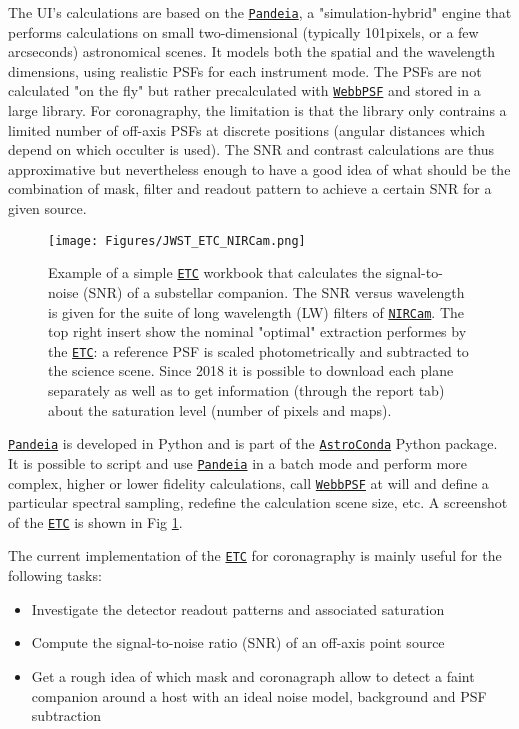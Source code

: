 \documentclass[]{spie}  %
\newcommand{\todo}[1]{\textcolor{red}{[#1]}}
\newcommand{\nircam}{{\tt \href{https://jwst.stsci.edu/instrumentation/nircam}{NIRCam}}\xspace}
\newcommand{\etc}{{\tt \href{https://jwst.etc.stsci.edu/}{ETC}}\xspace}
\newcommand{\pandeia}{{\tt \href{https://pypi.org/project/pandeia.engine/}{Pandeia}}\xspace}
\newcommand{\astroconda}{{\tt \href{https://astroconda.readthedocs.io/en/latest/}{AstroConda}}\xspace}
\newcommand{\webbpsf}{{\tt \href{https://webbpsf.readthedocs.io/en/stable/}{WebbPSF}}\xspace}%
\def\begini{\begin{itemize}[itemsep=0.5pt,topsep=0.5pt]}
\def\endi{\end{itemize}}
\begin{document}
The UI's calculations are based on the \pandeia\cite{pontoppidan2016_spie_pandeia}, a "simulation-hybrid" engine that performs calculations on small two-dimensional (typically 101pixels, or a few arcseconds) astronomical scenes. It models both the spatial and the wavelength dimensions, using realistic PSFs for each instrument mode. The PSFs are not calculated "on the fly" but rather precalculated with \webbpsf and stored in a large library. For coronagraphy, the limitation is that the library only contrains a limited number of off-axis PSFs at discrete positions (angular distances which depend on which occulter is used). The SNR and contrast calculations are thus approximative but nevertheless enough to have a good idea of what should be the combination of mask, filter and readout pattern to achieve a certain SNR for a given source.

\begin{figure}[h!]
\begin{center}
\texttt{[image: Figures/JWST\_ETC\_NIRCam.png]}
\caption{Example of a simple \etc workbook that calculates the signal-to-noise (SNR) of a substellar companion. The SNR versus wavelength is given for the suite of long wavelength (LW) filters of \nircam. The top right insert show the nominal "optimal" extraction performes by the \etc: a reference PSF is scaled photometrically and subtracted to the science scene. Since 2018 it is possible to download each plane separately as well as to get information (through the report tab) about the saturation level (number of pixels and maps).}
\label{fig:jwst-etc}
\end{center}
\end{figure}

\pandeia is developed in Python and is part of the \astroconda Python package. It is possible to script and use \pandeia in a batch mode and perform more complex, higher or lower fidelity calculations, call \webbpsf at will and define a particular spectral sampling, redefine the calculation scene size, etc. A screenshot of the \etc is shown in Fig \ref{fig:jwst-etc}.

The current implementation of the \etc for coronagraphy is mainly useful for the following tasks:
\begini
\item Investigate the detector readout patterns and associated saturation
\item Compute the signal-to-noise ratio (SNR) of an off-axis point source 
\item Get a rough idea of which mask and coronagraph allow to detect a faint companion around a host with an ideal noise model, background and PSF subtraction
\endi
\end{document}
